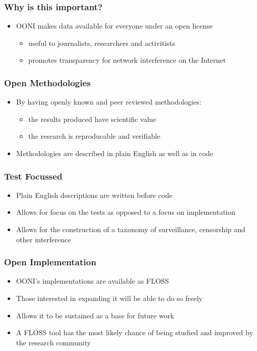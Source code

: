 \documentclass{beamer}
\begin{document}
\begin{frame}
	\frametitle{Why is this important?}
	\begin{itemize}
		\item{OONI makes data available for everyone under an open
			license}
			\begin{itemize}
				\item{useful to journalists, researchers and activitists}
				\item{promotes transparency for network interference on the Internet}
			\end{itemize}
	\end{itemize}
\end{frame}

\begin{frame}
	\frametitle{Open Methodologies}
	\begin{itemize}
		\item{By having openly known and peer reviewed methodologies:}
		\begin{itemize}
			\item{the results produced have scientific value}
			\item{the research is reproducable and verifiable}
		\end{itemize}
		\item{Methodologies are described in plain English as well as in code}
	\end{itemize}
\end{frame}

\begin{frame}
	\frametitle{Test Focussed}
	\begin{itemize}
		\item{Plain English descriptions are written before code}
		\item{Allows for focus on the tests as opposed to a focus on implementation}
		\item{Allows for the construction of a taxonomy of surveillance, censorship and other interference}
	\end{itemize}
\end{frame}

\begin{frame}
	\frametitle{Open Implementation}
	\begin{itemize}
		\item{OONI's implementations are available as FLOSS}
		\item{Those interested in expanding it will be able to do so freely}
		\item{Allows it to be sustained as a base for future work}
		\item{A FLOSS tool has the most likely chance of being studied and improved by the research community}
	\end{itemize}
\end{frame}
\end{document}
